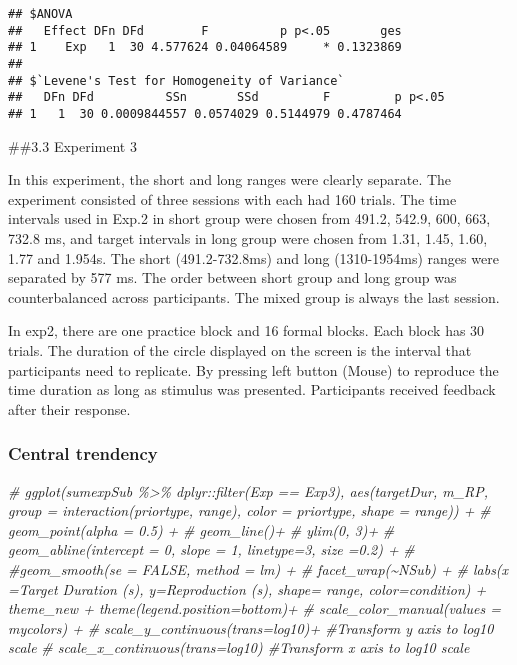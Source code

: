 \documentclass[
]{article}
\newenvironment{Shaded}{\begin{snugshade}}{\end{snugshade}}
\newcommand{\CommentTok}[1]{\textcolor[rgb]{0.56,0.35,0.01}{\textit{#1}}}
\begin{document}
\begin{verbatim}
## $ANOVA
##   Effect DFn DFd        F          p p<.05       ges
## 1    Exp   1  30 4.577624 0.04064589     * 0.1323869
## 
## $`Levene's Test for Homogeneity of Variance`
##   DFn DFd          SSn       SSd         F         p p<.05
## 1   1  30 0.0009844557 0.0574029 0.5144979 0.4787464
\end{verbatim}

\#\#3.3 Experiment 3

In this experiment, the short and long ranges were clearly separate. The
experiment consisted of three sessions with each had 160 trials. The
time intervals used in Exp.2 in short group were chosen from 491.2,
542.9, 600, 663, 732.8 ms, and target intervals in long group were
chosen from 1.31, 1.45, 1.60, 1.77 and 1.954s. The short (491.2-732.8ms)
and long (1310-1954ms) ranges were separated by 577 ms. The order
between short group and long group was counterbalanced across
participants. The mixed group is always the last session.

In exp2, there are one practice block and 16 formal blocks. Each block
has 30 trials. The duration of the circle displayed on the screen is the
interval that participants need to replicate. By pressing left button
(Mouse) to reproduce the time duration as long as stimulus was
presented. Participants received feedback after their response.

\hypertarget{central-trendency-1}{%
\subsubsection{Central trendency}\label{central-trendency-1}}

\begin{Shaded}
\begin{Highlighting}[]
\CommentTok{\# ggplot(sumexpSub \%\textgreater{}\% dplyr::filter(Exp == \textquotesingle{}Exp3\textquotesingle{}), aes(targetDur, m\_RP, group = interaction(priortype, range), color = priortype, shape = range)) + }
\CommentTok{\#   geom\_point(alpha = 0.5) + }
\CommentTok{\#   geom\_line()+}
\CommentTok{\#   ylim(0, 3)+}
\CommentTok{\#   geom\_abline(intercept = 0, slope = 1, linetype=3, size =0.2) +}
\CommentTok{\#   \#geom\_smooth(se = FALSE, method = \textquotesingle{}lm\textquotesingle{}) +}
\CommentTok{\#   facet\_wrap(\textasciitilde{}NSub) +}
\CommentTok{\#   labs(x =\textquotesingle{}Target Duration (s)\textquotesingle{}, y=\textquotesingle{}Reproduction (s)\textquotesingle{}, shape= \textquotesingle{}range\textquotesingle{}, color=\textquotesingle{}condition\textquotesingle{}) + theme\_new + theme(legend.position=\textquotesingle{}bottom\textquotesingle{})+}
\CommentTok{\#   scale\_color\_manual(values = mycolors) +}
\CommentTok{\#   scale\_y\_continuous(trans=\textquotesingle{}log10\textquotesingle{})+ \#Transform y axis to log10 scale}
\CommentTok{\#   scale\_x\_continuous(trans=\textquotesingle{}log10\textquotesingle{}) \#Transform x axis to log10 scale}
\end{Highlighting}
\end{Shaded}
\end{document}
